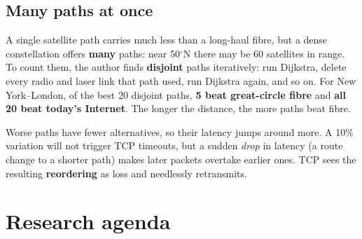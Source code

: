 
\subsection{Many paths at once}
A single satellite path carries much less than a long-haul fibre, but a dense constellation offers \textbf{many} paths: near 50$^\circ$N there may be 60 satellites in
range. To count them, the author finds \textbf{disjoint} paths iteratively: run Dijkstra, delete every radio and laser link that path used, run Dijkstra again, and so on.
For New York--London, of the best 20 disjoint paths, \textbf{5 beat great-circle fibre} and \textbf{all 20 beat today's Internet}. The longer the distance, the more
paths beat fibre.

Worse paths have fewer alternatives, so their latency jumps around more. A 10\% variation will not trigger TCP timeouts, but a sudden \emph{drop} in latency (a route change
to a shorter path) makes later packets overtake earlier ones. TCP sees the resulting \textbf{reordering} as loss and needlessly retransmits.

\section{Research agenda}

